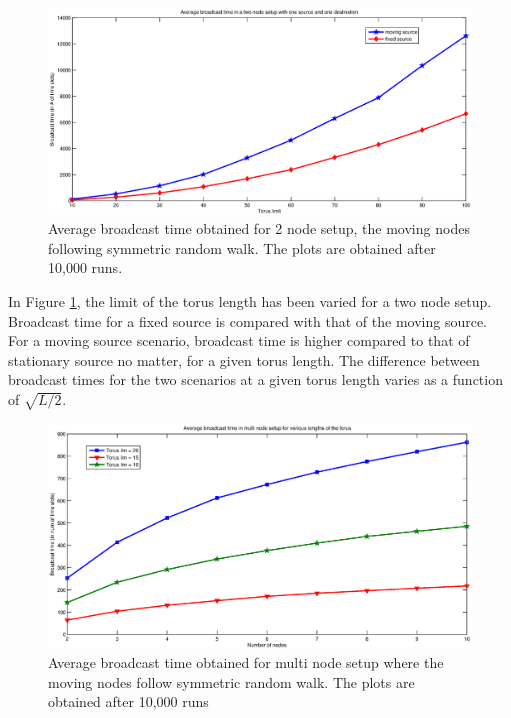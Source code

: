 \documentclass[a4paper,10pt,english]{article}
\begin{document}
\begin{figure}[!ht]
	\begin{center}
		\includegraphics[scale = 0.40]{fixed_move_2nodes.eps}
		\caption{Average broadcast time obtained for 2 node setup, the moving nodes following symmetric random walk. The plots are obtained after 10,000 runs.}
		\label{2node}
	\end{center}
\end{figure}
In Figure \ref{2node}, the limit of the torus length has been varied for a two node setup. Broadcast time for a fixed source is compared with that of the moving source. For a moving source scenario, broadcast time is higher compared to that of stationary source no matter, for a given torus length. The difference between broadcast times for the two scenarios at a given torus length varies as a function of $\sqrt{L/2}$.

\begin{figure}[!ht]
\centering
		\includegraphics[scale = 0.5]{multi_node_torus.eps}
		\caption{Average broadcast time obtained for multi node setup where the moving nodes follow symmetric random walk. The plots are obtained after 10,000 runs}
		\label{multinode_torus}
\end{figure}
\end{document}
